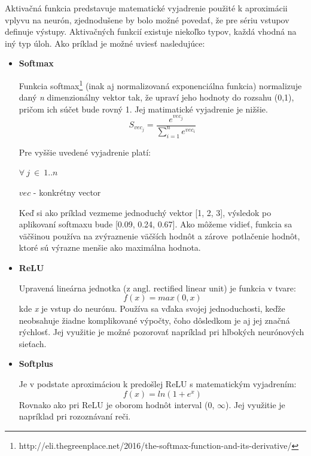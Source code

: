 Aktivačná funkcia predstavuje matematické vyjadrenie použité k aproximácii vplyvu na neurón, zjednodušene by bolo možné povedať, že pre sériu vstupov definuje výstupy. Aktivačných funkcií existuje niekoľko typov, každá vhodná na iný typ úloh. Ako príklad je možné uviesť nasledujúce: 
	\begin{itemize}
		\item {\textbf{Softmax}}
		
		Funkcia softmax\footnote{http://eli.thegreenplace.net/2016/the-softmax-function-and-its-derivative/} (inak aj normalizovaná exponenciálna funkcia) normalizuje daný  \textit{n} dimenzionálny vektor tak, že upraví jeho hodnoty do rozsahu (0,1), pričom ich súčet bude rovný 1. Jej matimatické vyjadrenie je nižšie. 
		\begin{equation}
		S_{vec_j} = \frac{e^{vec_j}}{\sum_{i=1}^{n}e^{vec_i}}
		\end{equation}
		
		Pre vyššie uvedené vyjadrenie platí:
		
		\(\forall{\ j\ }\in\ 1..n\)
		
		\(vec \) - konkrétny vector
		
		Keď si ako príklad vezmeme jednoduchý vektor [1, 2, 3], výsledok po aplikovaní softmaxu bude [0.09, 0.24, 0.67]. Ako môžeme vidieť, funkcia sa väčšinou používa na zvýraznenie väčších hodnôt a zárove\ potlačenie hodnôt, ktoré sú výrazne menšie ako maximálna hodnota. 
		
		\item {\textbf{ReLU}}
		
		Upravená lineárna jednotka (z angl. rectified linear unit) je funkcia 
		v tvare:
		\begin{equation}
		f(x) = max (0, x)
		\end{equation}
		kde \textit{x} je vstup do neurónu. Používa sa vďaka svojej jednoduchosti, keďže neobsahuje žiadne komplikované výpočty, čoho dôsledkom je aj jej značná rýchlosť. Jej využitie je možné pozorovať napríklad pri hlbokých neurónových sieťach.
		
		\item{\textbf{Softplus}}
		
		Je v podstate aproximáciou k predošlej ReLU s matematickým vyjadrením:
		\begin{equation}
		f(x)=ln (1 + e^x)
		\end{equation}
		Rovnako ako pri ReLU je oborom hodnôt interval (0, \(\infty\)). Jej využitie je napríklad pri rozoznávaní reči.
		

\end{itemize}
